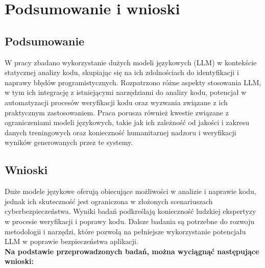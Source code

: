 
\chapter*{Podsumowanie i wnioski}

\section*{Podsumowanie}
W pracy zbadano wykorzystanie dużych modeli językowych (LLM) w kontekście statycznej analizy kodu, skupiając się na ich zdolnościach do identyfikacji i naprawy błędów programistycznych. Rozpatrzono różne aspekty stosowania LLM, w tym ich integrację z istniejącymi narzędziami do analizy kodu, potencjał w automatyzacji procesów weryfikacji kodu oraz wyzwania związane z ich praktycznym zastosowaniem. Praca porusza również kwestie związane z ograniczeniami modeli językowych, takie jak ich zależność od jakości i zakresu danych treningowych oraz konieczność humanitarnej nadzoru i weryfikacji wyników generowanych przez te systemy.

\section*{Wnioski}
Duże modele językowe oferują obiecujące możliwości w analizie i naprawie kodu, jednak ich skuteczność jest ograniczona w złożonych scenariuszach cyberbezpieczeństwa. Wyniki badań podkreślają konieczność ludzkiej ekspertyzy w procesie weryfikacji i poprawy kodu. Dalsze badania są potrzebne do rozwoju metodologii i narzędzi, które pozwolą na pełniejsze wykorzystanie potencjału LLM w poprawie bezpieczeństwa aplikacji. 
\\
\textbf{Na podstawie przeprowadzonych badań, można wyciągnąć następujące wnioski:}

